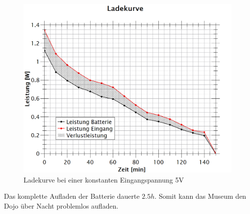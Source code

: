 \begin{figure}[htb]
	\centering
	\includegraphics[width=\textwidth]{graphics/ladekurve.png}
	\caption{Ladekurve bei einer konstanten Eingangspannung 5V}
	\label{fig:Ladeleistung}
\end{figure}


Das komplette Aufladen der Batterie dauerte $2.5h$. Somit kann das Museum den Dojo über Nacht problemlos aufladen.